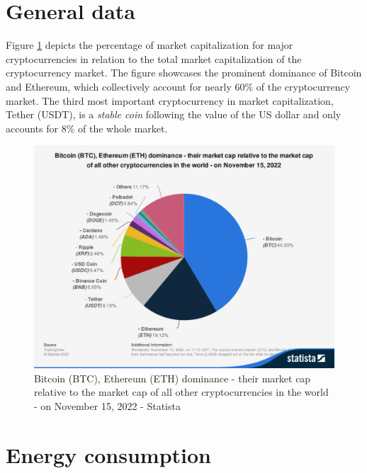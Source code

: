 \section{General data}

Figure \ref{F_market_cap} depicts the percentage of market capitalization for major cryptocurrencies in relation to the total market capitalization of the cryptocurrency market. The figure showcases the prominent dominance of Bitcoin and Ethereum, which collectively account for nearly 60\% of the cryptocurrency market. The third most important cryptocurrency in market capitalization, Tether (USDT), is a \emph{stable coin} following the value of the US dollar and only accounts for 8\% of the whole market.
\begin{figure}[ht]
\centering
 \includegraphics[scale=0.33]{Images/market_dominance.pdf}
\caption{Bitcoin (BTC), Ethereum (ETH) dominance - their market cap relative to the market cap of all other cryptocurrencies in the world - on November 15, 2022 - Statista \cite{tradingview2022}}
\label{F_market_cap}
\end{figure}

\section{Energy consumption}

